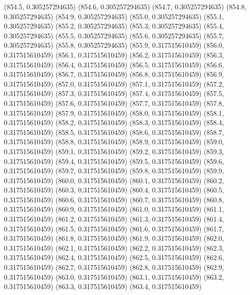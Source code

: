 {					(854.5, 0.305257294635)
					(854.6, 0.305257294635)
					(854.7, 0.305257294635)
					(854.8, 0.305257294635)
					(854.9, 0.305257294635)
					(855.0, 0.305257294635)
					(855.1, 0.305257294635)
					(855.2, 0.305257294635)
					(855.3, 0.305257294635)
					(855.4, 0.305257294635)
					(855.5, 0.305257294635)
					(855.6, 0.305257294635)
					(855.7, 0.305257294635)
					(855.8, 0.305257294635)
					(855.9, 0.317515610459)
					(856.0, 0.317515610459)
					(856.1, 0.317515610459)
					(856.2, 0.317515610459)
					(856.3, 0.317515610459)
					(856.4, 0.317515610459)
					(856.5, 0.317515610459)
					(856.6, 0.317515610459)
					(856.7, 0.317515610459)
					(856.8, 0.317515610459)
					(856.9, 0.317515610459)
					(857.0, 0.317515610459)
					(857.1, 0.317515610459)
					(857.2, 0.317515610459)
					(857.3, 0.317515610459)
					(857.4, 0.317515610459)
					(857.5, 0.317515610459)
					(857.6, 0.317515610459)
					(857.7, 0.317515610459)
					(857.8, 0.317515610459)
					(857.9, 0.317515610459)
					(858.0, 0.317515610459)
					(858.1, 0.317515610459)
					(858.2, 0.317515610459)
					(858.3, 0.317515610459)
					(858.4, 0.317515610459)
					(858.5, 0.317515610459)
					(858.6, 0.317515610459)
					(858.7, 0.317515610459)
					(858.8, 0.317515610459)
					(858.9, 0.317515610459)
					(859.0, 0.317515610459)
					(859.1, 0.317515610459)
					(859.2, 0.317515610459)
					(859.3, 0.317515610459)
					(859.4, 0.317515610459)
					(859.5, 0.317515610459)
					(859.6, 0.317515610459)
					(859.7, 0.317515610459)
					(859.8, 0.317515610459)
					(859.9, 0.317515610459)
					(860.0, 0.317515610459)
					(860.1, 0.317515610459)
					(860.2, 0.317515610459)
					(860.3, 0.317515610459)
					(860.4, 0.317515610459)
					(860.5, 0.317515610459)
					(860.6, 0.317515610459)
					(860.7, 0.317515610459)
					(860.8, 0.317515610459)
					(860.9, 0.317515610459)
					(861.0, 0.317515610459)
					(861.1, 0.317515610459)
					(861.2, 0.317515610459)
					(861.3, 0.317515610459)
					(861.4, 0.317515610459)
					(861.5, 0.317515610459)
					(861.6, 0.317515610459)
					(861.7, 0.317515610459)
					(861.8, 0.317515610459)
					(861.9, 0.317515610459)
					(862.0, 0.317515610459)
					(862.1, 0.317515610459)
					(862.2, 0.317515610459)
					(862.3, 0.317515610459)
					(862.4, 0.317515610459)
					(862.5, 0.317515610459)
					(862.6, 0.317515610459)
					(862.7, 0.317515610459)
					(862.8, 0.317515610459)
					(862.9, 0.317515610459)
					(863.0, 0.317515610459)
					(863.1, 0.317515610459)
					(863.2, 0.317515610459)
					(863.3, 0.317515610459)
					(863.4, 0.317515610459)
}

